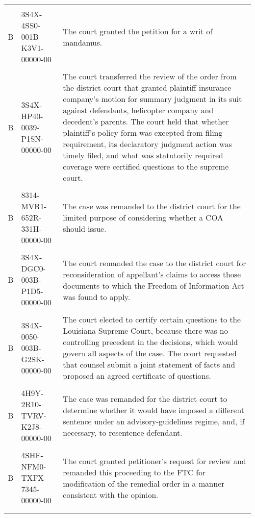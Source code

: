 \documentclass[10pt, letterpaper]{article}
\begin{document}
\begin{spacing}{1.0}
\begin{small}
\begin{longtable}[H]{llp{4in}}
    & &\\[-4pt]
    B & 3S4X-4SS0-001B-K3V1-00000-00 & The court granted the petition for a writ of mandamus.\\
    & &\\[-4pt]
    B & 3S4X-HP40-0039-P1SN-00000-00 & The court transferred the review of the order from the district court that granted plaintiff insurance company's motion for summary judgment in its suit against defendants, helicopter company and decedent's parents. The court held that whether plaintiff's policy form was excepted from filing requirement, its declaratory judgment action was timely filed, and what was statutorily required coverage were certified questions to the supreme court.\\
    & &\\[-4pt]
    B & 8314-MVR1-652R-331H-00000-00 & The case was remanded to the district court for the limited purpose of considering whether a COA should issue.\\
    & &\\[-4pt]
    B & 3S4X-DGC0-003B-P1D5-00000-00 & The court remanded the case to the district court for reconsideration of appellant's claims to access those documents to which the Freedom of Information Act was found to apply.\\
    & &\\[-4pt]
    B & 3S4X-0050-003B-G2SK-00000-00 & The court elected to certify certain questions to the Louisiana Supreme Court, because there was no controlling precedent in the decisions, which would govern all aspects of the case. The court requested that counsel submit a joint statement of facts and proposed an agreed certificate of questions.\\
    & &\\[-4pt]
    B & 4H9Y-2R10-TVRV-K2J8-00000-00 & The case was remanded for the district court to determine whether it would have imposed a different sentence under an advisory-guidelines regime, and, if necessary, to resentence defendant.\\
    & &\\[-4pt]
    B & 4SHF-NFM0-TXFX-7345-00000-00 & The court granted petitioner's request for review and remanded this proceeding to the FTC for modification of the remedial order in a manner consistent with the opinion.\\[4pt]
    \hline\\
    \label{tab:otherNonEmptuOutcome}
\end{longtable}
\end{small}


\end{spacing}
\end{document}
